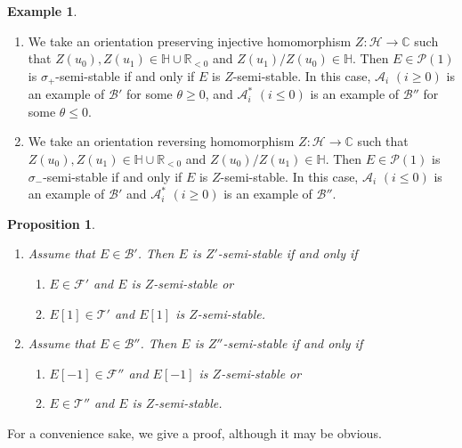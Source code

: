 \documentclass[leqno,11pt]{amsart}
\def\C{\ensuremath{\mathbb{C}}}
\def\H{\ensuremath{\mathbb{H}}}
\def\R{\ensuremath{\mathbb{R}}}
\newtheorem{Prop}[Thm]{Proposition}
\theoremstyle{definition}
\newtheorem{Ex}[Thm]{Example}
\def\C{\ensuremath{\mathbb{C}}}
\def\H{\ensuremath{\mathbb{H}}}
\def\R{\ensuremath{\mathbb{R}}}
\def\AA{\ensuremath{\mathcal A}}
\def\BB{\ensuremath{\mathcal B}}
\def\FF{\ensuremath{\mathcal F}}
\def\HH{\ensuremath{\mathcal H}}
\def\PP{\ensuremath{\mathcal P}}
\def\TT{\ensuremath{\mathcal T}}
\begin{document}
\begin{Ex}\label{ex:BB}
\begin{enumerate}
\item[(1)]
We take an orientation preserving injective homomorphism 
$Z:\HH \to \C$ such that $Z(u_0),Z(u_1) \in \H \cup \R_{<0}$
and $Z(u_1)/Z(u_0) \in \H$.
Then $E \in \PP(1)$ is $\sigma_+$-semi-stable if and only if
$E$ is $Z$-semi-stable.
In this case, $\AA_i$ $(i \geq 0)$ is an example of $\BB'$
for some $\theta \geq 0$,
and $\AA_i^*$ $(i \leq 0)$ is an example of $\BB''$
for some $\theta \leq 0$. 
\item[(2)]
We take an orientation reversing homomorphism 
$Z:\HH \to \C$ such that $Z(u_0),Z(u_1) \in \H \cup \R_{<0}$
and $Z(u_0)/Z(u_1) \in \H$.
Then $E \in \PP(1)$ is $\sigma_-$-semi-stable if and only if
$E$ is $Z$-semi-stable.
In this case, $\AA_i$ $(i \leq 0)$ is an example of $\BB'$
and $\AA_i^*$ $(i \geq 0)$ is an example of $\BB''$. 
\end{enumerate}
\end{Ex}

 

\begin{Prop}\label{Prop:BB}
\begin{enumerate}
\item[(1)]
Assume that $E\in \BB'$.
Then $E$ is $Z'$-semi-stable if and only if 
\begin{enumerate}
\item[(i)]
 $E \in \FF'$
and $E$ is $Z$-semi-stable or 
\item[(ii)]
 $E[1] \in \TT'$ and
$E[1]$ is $Z$-semi-stable.
\end{enumerate}
\item[(2)]
Assume that $E\in \BB''$.
Then $E$ is $Z''$-semi-stable if and only if 
\begin{enumerate}
\item[(i)]
 $E[-1] \in \FF''$ and
$E[-1]$ is $Z$-semi-stable or
\item[(ii)]
 $E \in \TT''$ and
$E$ is $Z$-semi-stable.
\end{enumerate}
\end{enumerate}
\end{Prop}

For a convenience sake, we give a proof,
although it may be obvious.
\end{document}
